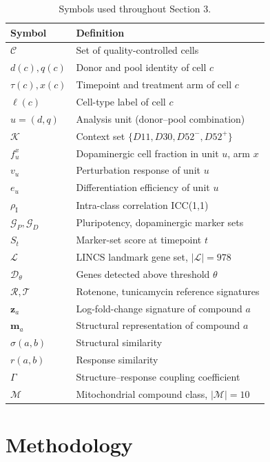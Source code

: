 \documentclass[5p,times,twocolumn]{elsarticle}
\begin{document}
\begin{table}[!htbp]
\centering
\small
\caption{Symbols used throughout Section 3.}
\begin{tabular}{ll}
\hline
Symbol & Definition \\
\hline
$\mathcal{C}$ & Set of quality-controlled cells \\
$d(c), q(c)$ & Donor and pool identity of cell $c$ \\
$\tau(c), x(c)$ & Timepoint and treatment arm of cell $c$ \\
$\ell(c)$ & Cell-type label of cell $c$ \\
$u=(d,q)$ & Analysis unit (donor--pool combination) \\
$\mathcal{K}$ & Context set $\{D11, D30, D52^-, D52^+\}$ \\
$f_u^{x}$ & Dopaminergic cell fraction in unit $u$, arm $x$ \\
$v_u$ & Perturbation response of unit $u$ \\
$e_u$ & Differentiation efficiency of unit $u$ \\
$\rho_{\mathrm{I}}$ & Intra-class correlation ICC(1,1) \\
$\mathcal{G}_P,\mathcal{G}_D$ & Pluripotency, dopaminergic marker sets \\
$S_t$ & Marker-set score at timepoint $t$ \\
$\mathcal{L}$ & LINCS landmark gene set, $|\mathcal{L}|=978$ \\
$\mathcal{D}_\theta$ & Genes detected above threshold $\theta$ \\
$\mathcal{R},\mathcal{T}$ & Rotenone, tunicamycin reference signatures \\
$\mathbf{z}_a$ & Log-fold-change signature of compound $a$ \\
$\mathbf{m}_a$ & Structural representation of compound $a$ \\
$\sigma(a,b)$ & Structural similarity \\
$r(a,b)$ & Response similarity \\
$\Gamma$ & Structure--response coupling coefficient \\
$\mathcal{M}$ & Mitochondrial compound class, $|\mathcal{M}|=10$ \\
\hline
\end{tabular}
\end{table}
\section{Methodology}
\end{document}

